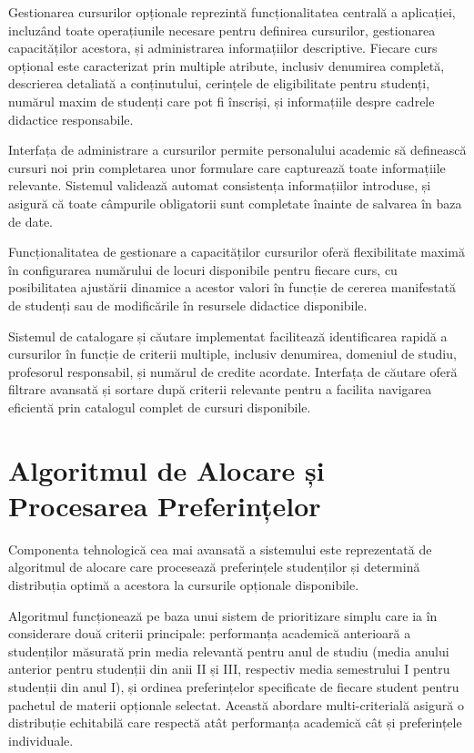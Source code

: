 \documentclass[12pt,a4paper]{report}
\begin{document}
Gestionarea cursurilor opționale reprezintă funcționalitatea centrală a aplicației, incluzând toate operațiunile necesare pentru definirea cursurilor, gestionarea capacităților acestora, și administrarea informațiilor descriptive. Fiecare curs opțional este caracterizat prin multiple atribute, inclusiv denumirea completă, descrierea detaliată a conținutului, cerințele de eligibilitate pentru studenți, numărul maxim de studenți care pot fi înscriși, și informațiile despre cadrele didactice responsabile.

Interfața de administrare a cursurilor permite personalului academic să definească cursuri noi prin completarea unor formulare care capturează toate informațiile relevante. Sistemul validează automat consistența informațiilor introduse, și asigură că toate câmpurile obligatorii sunt completate înainte de salvarea în baza de date.

Funcționalitatea de gestionare a capacităților cursurilor oferă flexibilitate maximă în configurarea numărului de locuri disponibile pentru fiecare curs, cu posibilitatea ajustării dinamice a acestor valori în funcție de cererea manifestată de studenți sau de modificările în resursele didactice disponibile.

Sistemul de catalogare și căutare implementat facilitează identificarea rapidă a cursurilor în funcție de criterii multiple, inclusiv denumirea, domeniul de studiu, profesorul responsabil, și numărul de credite acordate. Interfața de căutare oferă filtrare avansată și sortare după criterii relevante pentru a facilita navigarea eficientă prin catalogul complet de cursuri disponibile.

\section{Algoritmul de Alocare și Procesarea Preferințelor}

Componenta tehnologică cea mai avansată a sistemului este reprezentată de algoritmul de alocare \cite{algorithm-design} care procesează preferințele studenților și determină distribuția optimă a acestora la cursurile opționale disponibile.

Algoritmul funcționează pe baza unui sistem de prioritizare simplu care ia în considerare două criterii principale: performanța academică anterioară a studenților măsurată prin media relevantă pentru anul de studiu (media anului anterior pentru studenții din anii II și III, respectiv media semestrului I pentru studenții din anul I), și ordinea preferințelor specificate de fiecare student pentru pachetul de materii opționale selectat.
Această abordare multi-criterială asigură o distribuție echitabilă care respectă atât performanța academică cât și preferințele individuale.
\end{document}
